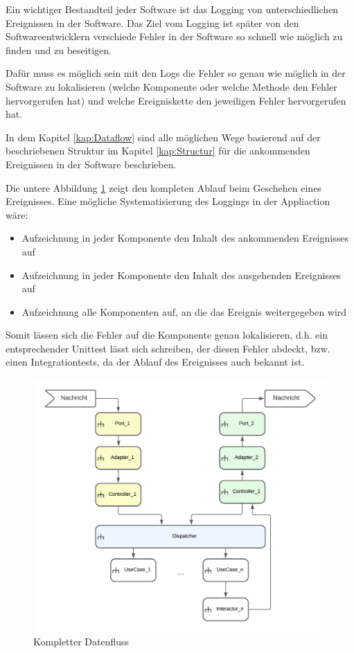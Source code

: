 Ein wichtiger Bestandteil jeder Software ist das Logging von unterschiedlichen Ereignissen in der Software.
Das Ziel vom Logging ist später von den Softwareentwicklern verschiede Fehler in der Software so schnell wie möglich zu finden und
zu beseitigen.

Dafür muss es möglich sein mit den Logs die Fehler so genau wie möglich in der Software zu lokalisieren 
(welche Komponente oder welche Methode den Fehler hervorgerufen hat) 
und welche Ereigniskette den jeweiligen Fehler hervorgerufen hat.

In dem Kapitel \ref{kap:Dataflow} sind alle möglichen Wege basierend auf der beschriebenen Struktur 
im Kapitel \ref{kap:Structur} für die ankommenden Ereignissen in der Software beschrieben.

Die untere Abbildung \ref{fig:FullDataFlow} zeigt den kompleten Ablauf beim Geschehen eines Ereignisses.
Eine mögliche Systematisierung des Loggings in der Appliaction wäre: 
\begin{itemize}
    \item Aufzeichnung in jeder Komponente den Inhalt des ankommenden Ereignisses auf
    \item Aufzeichnung in jeder Komponente den Inhalt des ausgehenden Ereignisses auf
    \item Aufzeichnung alle Komponenten auf, an die das Ereignis weitergegeben wird
\end{itemize}

Somit lässen sich die Fehler auf die Komponente genau lokalisieren, d.h. ein entsprechender Unittest lässt sich schreiben, 
der diesen Fehler abdeckt, bzw. einen Integrationtests, da der Ablauf des Ereignisses auch bekannt ist.

\begin{figure}[H]
    \centering
    \includegraphics[width=12cm]{./images/FullDataFlow.png}
     \caption[Kompletter Datenfluss]{Kompletter Datenfluss}
     \label{fig:FullDataFlow}
\end{figure}

